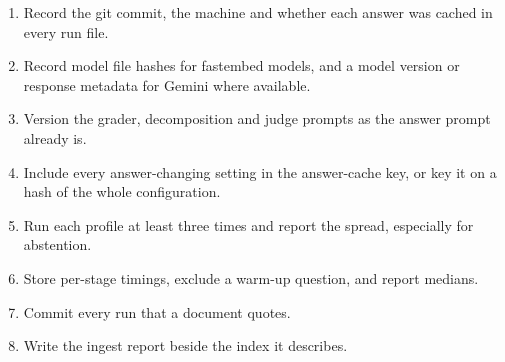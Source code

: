 \begin{recommended}
\begin{enumerate}
  \item Record the git commit, the machine and whether each answer was cached in every run file.
  \item Record model file hashes for fastembed models, and a model version or response metadata for Gemini where available.
  \item Version the grader, decomposition and judge prompts as the answer prompt already is.
  \item Include every answer-changing setting in the answer-cache key, or key it on a hash of the whole configuration.
  \item Run each profile at least three times and report the spread, especially for abstention.
  \item Store per-stage timings, exclude a warm-up question, and report medians.
  \item Commit every run that a document quotes.
  \item Write the ingest report beside the index it describes.
\end{enumerate}
\end{recommended}
